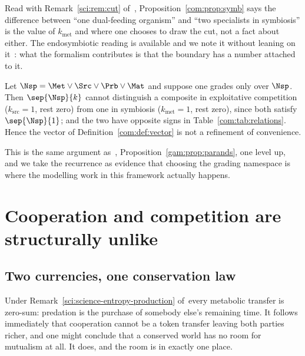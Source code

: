 \begin{remark}\label{com:organism-boundary-grade}
Read with Remark~\ref{sci:rem:cut} of~\chSci, Proposition~\ref{com:prop:symb} says the difference between
``one dual-feeding organism'' and ``two specialists in symbiosis'' is the value of
$k_{\mathrm{met}}$ and where one chooses to draw the cut, not a fact about either. The
endosymbiotic reading is available and we note it without leaning on it~\cite{Margulis}: what the
formalism contributes is that the boundary has a number attached to it.
\end{remark}

\begin{proposition}\label{com:grading-namespace-must-be}
Let $\Nsp = \Met \vee \Src \vee \Prb \vee \Mat$ and suppose one grades only over $\Nsp$. Then
$\sep{\Nsp}{k}$ cannot distinguish a composite in exploitative competition ($k_{\mathrm{src}}=1$,
rest zero) from one in symbiosis ($k_{\mathrm{met}}=1$, rest zero), since both satisfy
$\sep{\Nsp}{1}$; and the two have opposite signs in Table~\ref{com:tab:relations}. Hence the vector
of Definition~\ref{com:def:vector} is not a refinement of convenience.
\end{proposition}

This is the same argument as~\chGame, Proposition~\ref{gam:prop:parands}, one level up, and we take the recurrence as
evidence that choosing the grading namespace is where the modelling work in this framework
actually happens.

\section{Cooperation and competition are structurally unlike}\label{com:sec:coop}\label{com:S6}

\subsection{Two currencies, one conservation law}\label{com:S6.1}

Under Remark~\ref{sci:science-entropy-production} of~\chSci every metabolic transfer is zero-sum: predation is the
purchase of somebody else's remaining time. It follows immediately that cooperation cannot be a
token transfer leaving both parties richer, and one might conclude that a conserved world has no
room for mutualism at all. It does, and the room is in exactly one place.

